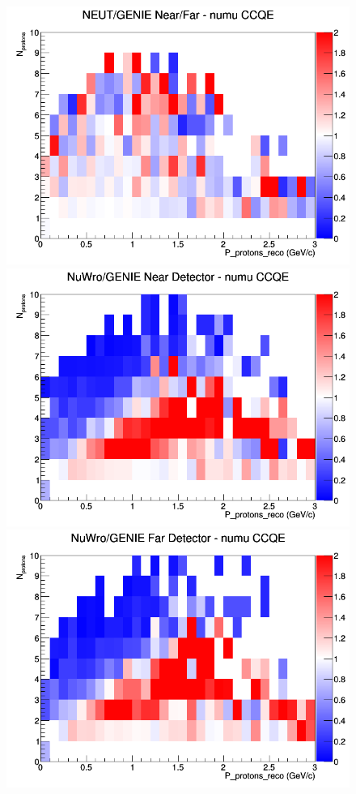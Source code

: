 \documentclass[12pt]{article}
\begin{document}
\begin{figure}[h]
\endminipage
{}
\includegraphics[width=\linewidth]{eff_N_P/LAr/protons/ratios/CCQE_NEUT_GENIE_numu_NF_N_P.png}
\endminipage
\newline
{}
\includegraphics[width=\linewidth]{eff_N_P/LAr/protons/ratios/CCQE_NuWro_GENIE_numu_near_N_P.png}
\endminipage
{}
\includegraphics[width=\linewidth]{eff_N_P/LAr/protons/ratios/CCQE_NuWro_GENIE_numu_far_N_P.png}

\end{figure}
\end{document}
